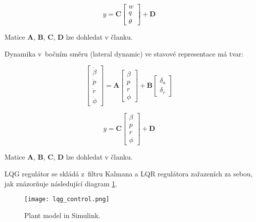 \begin{equation}
    y = \textbf{C}
    \begin{bmatrix}
        w \\
        q \\
        \theta 
    \end{bmatrix} + \textbf{D}
\end{equation}

Matice \textbf{A}, \textbf{B}, \textbf{C}, \textbf{D} lze dohledat v članku.


Dynamika v bočním směru (lateral dynamic) ve stavové representace má tvar:


\begin{equation}
    \begin{bmatrix}
        \dot{\beta} \\
        \dot{p} \\
        \dot{r} \\
        \dot{\phi} 
    \end{bmatrix} 
    = \textbf{A}   
    \begin{bmatrix}
        \beta \\
        p \\
        r \\
        \phi 
    \end{bmatrix} 
    + \textbf{B}
    \begin{bmatrix}
        \delta_a \\
        \delta_r
    \end{bmatrix} 
\end{equation}

\begin{equation}
    y = \textbf{C} 
    \begin{bmatrix}
        \beta \\
        p \\
        r \\
        \phi 
    \end{bmatrix} + \textbf{D}
\end{equation}

Matice \textbf{A}, \textbf{B}, \textbf{C}, \textbf{D} lze dohledat v članku.

LQG regulátor se skládá z filtru Kalmana a LQR regulátora zařazeních za sebou,
jak znázorňuje následující diagram \ref{fig:lqg_control}. 
\begin{figure}[ht]
    \centering
    \texttt{[image: lqg\_control.png]}
    \caption{Plant model in Simulink.}
    \label{fig:lqg_control}
\end{figure} \\

